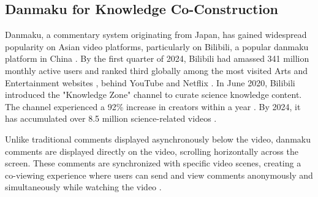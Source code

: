 
\subsection{Danmaku for Knowledge Co-Construction}
Danmaku, a commentary system originating from Japan, has gained widespread popularity on Asian video platforms, particularly on Bilibili, a popular danmaku platform in China \cite{bilibili_about_us}. By the first quarter of 2024, Bilibili had amassed 341 million monthly active users \cite{bilibili2024investor} and ranked third globally among the most visited Arts and Entertainment websites \cite{similarweb_top}, behind YouTube \cite{youtube} and Netflix \cite{netflix}. 
In June 2020, Bilibili introduced the "Knowledge Zone" channel to curate science knowledge content. The channel experienced a 92\% increase in creators within a year \cite{bilibili2021report}. By 2024, it has accumulated over 8.5 million science-related videos \cite{bilibili2023esg}.

Unlike traditional comments displayed asynchronously below the video, danmaku comments are displayed directly on the video, scrolling horizontally across the screen. These comments are synchronized with specific video scenes, creating a co-viewing experience where users can send and view comments anonymously and simultaneously while watching the video \cite{chen2017watching, chen2024towards}. 

